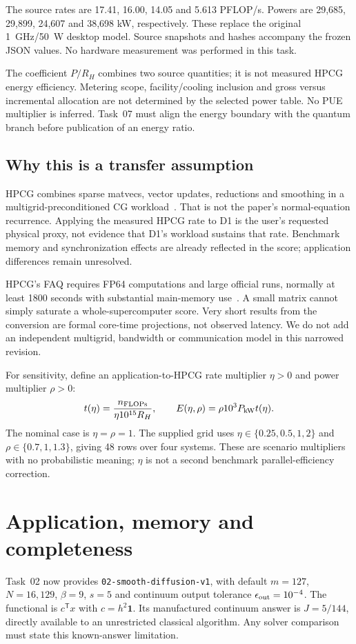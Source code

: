 \documentclass[11pt,a4paper]{article}
\begin{document}
The source rates are 17.41, 16.00, 14.05 and 5.613 PFLOP/s. Powers are 29,685, 29,899, 24,607 and 38,698 kW, respectively. These replace the original 1~GHz/50~W desktop model. Source snapshots and hashes accompany the frozen JSON values. No hardware measurement was performed in this task.

The coefficient $P/R_H$ combines two source quantities; it is not measured HPCG energy efficiency. Metering scope, facility/cooling inclusion and gross versus incremental allocation are not determined by the selected power table. No PUE multiplier is inferred. Task~07 must align the energy boundary with the quantum branch before publication of an energy ratio.

\subsection{Why this is a transfer assumption}
HPCG combines sparse matvecs, vector updates, reductions and smoothing in a multigrid-preconditioned CG workload~\cite{hpcghome}. That is not the paper's normal-equation recurrence. Applying the measured HPCG rate to D1 is the user's requested physical proxy, not evidence that D1's workload sustains that rate. Benchmark memory and synchronization effects are already reflected in the score; application differences remain unresolved.

HPCG's FAQ requires FP64 computations and large official runs, normally at least 1800 seconds with substantial main-memory use~\cite{hpcgfaq}. A small matrix cannot simply saturate a whole-supercomputer score. Very short results from the conversion are formal core-time projections, not observed latency. We do not add an independent multigrid, bandwidth or communication model in this narrowed revision.

For sensitivity, define an application-to-HPCG rate multiplier $\eta>0$ and power multiplier $\rho>0$:
\begin{equation}
 t(\eta)=\frac{n_{\rm FLOPs}}{\eta10^{15}R_H},\qquad
 E(\eta,\rho)=\rho10^3P_{\rm kW}t(\eta).
\end{equation}
The nominal case is $\eta=\rho=1$. The supplied grid uses $\eta\in\{0.25,0.5,1,2\}$ and $\rho\in\{0.7,1,1.3\}$, giving 48 rows over four systems. These are scenario multipliers with no probabilistic meaning; $\eta$ is not a second benchmark parallel-efficiency correction.

\section{Application, memory and completeness}
Task~02 now provides \texttt{02-smooth-diffusion-v1}, with default $m=127$, $N=16{,}129$, $\beta=9$, $s=5$ and continuum output tolerance $\epsilon_{\rm out}=10^{-4}$. The functional is $c^{\mathsf T}x$ with $c=h^2\mathbf1$. Its manufactured continuum answer is $J=5/144$, directly available to an unrestricted classical algorithm. Any solver comparison must state this known-answer limitation.
\end{document}

